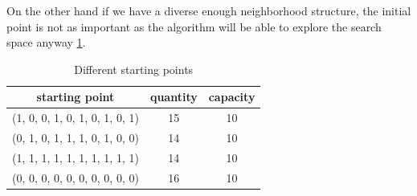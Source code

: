 On the other hand if we have a diverse enough neighborhood structure, the initial point is not as important as the algorithm will be able to explore the search space anyway \ref{tab:start}.
\begin{table}[H]
    \centering
    \begin{tabular}{c||c |c}
        starting point                 & quantity & capacity \\ \hline
        (1, 0, 0, 1, 0, 1, 0, 1, 0, 1) & 15       & 10       \\
        (0, 1, 0, 1, 1, 1, 0, 1, 0, 0) & 14       & 10       \\
        (1, 1, 1, 1, 1, 1, 1, 1, 1, 1) & 14       & 10       \\
        (0, 0, 0, 0, 0, 0, 0, 0, 0, 0) & 16       & 10       \\
    \end{tabular}
    \caption{Different starting points}
    \label{tab:start}
\end{table}

